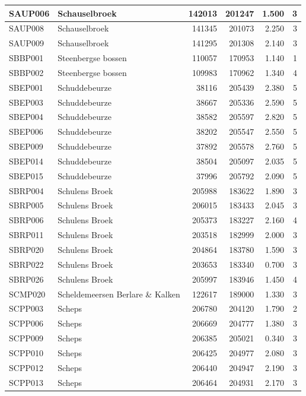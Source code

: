 \documentclass[11pt,]{book}
\begin{document}
\begin{table}
\begin{tabular}[t]{l|l|r|r|r|r}
SAUP006 & Schauselbroek & 142013 & 201247 & 1.500 & 3\\
\hline
SAUP008 & Schauselbroek & 141345 & 201073 & 2.250 & 3\\
\hline
SAUP009 & Schauselbroek & 141295 & 201308 & 2.140 & 3\\
\hline
SBBP001 & Steenbergse bossen & 110057 & 170953 & 1.140 & 1\\
\hline
SBBP002 & Steenbergse bossen & 109983 & 170962 & 1.340 & 4\\
\hline
SBEP001 & Schuddebeurze & 38116 & 205439 & 2.380 & 5\\
\hline
SBEP003 & Schuddebeurze & 38667 & 205336 & 2.590 & 5\\
\hline
SBEP004 & Schuddebeurze & 38582 & 205597 & 2.820 & 5\\
\hline
SBEP006 & Schuddebeurze & 38202 & 205547 & 2.550 & 5\\
\hline
SBEP009 & Schuddebeurze & 37892 & 205578 & 2.760 & 5\\
\hline
SBEP014 & Schuddebeurze & 38504 & 205097 & 2.035 & 5\\
\hline
SBEP015 & Schuddebeurze & 37996 & 205792 & 2.090 & 5\\
\hline
SBRP004 & Schulens Broek & 205988 & 183622 & 1.890 & 3\\
\hline
SBRP005 & Schulens Broek & 206015 & 183433 & 2.045 & 3\\
\hline
SBRP006 & Schulens Broek & 205373 & 183227 & 2.160 & 4\\
\hline
SBRP011 & Schulens Broek & 203518 & 182999 & 2.000 & 3\\
\hline
SBRP020 & Schulens Broek & 204864 & 183780 & 1.590 & 3\\
\hline
SBRP022 & Schulens Broek & 203653 & 183340 & 0.700 & 3\\
\hline
SBRP026 & Schulens Broek & 205997 & 183946 & 1.450 & 4\\
\hline
SCMP020 & Scheldemeersen Berlare \& Kalken & 122617 & 189000 & 1.330 & 3\\
\hline
SCPP003 & Scheps & 206780 & 204120 & 1.790 & 2\\
\hline
SCPP006 & Scheps & 206669 & 204777 & 1.380 & 3\\
\hline
SCPP009 & Scheps & 206385 & 205021 & 0.340 & 3\\
\hline
SCPP010 & Scheps & 206425 & 204977 & 2.080 & 3\\
\hline
SCPP012 & Scheps & 206440 & 204947 & 2.190 & 3\\
\hline
SCPP013 & Scheps & 206464 & 204931 & 2.170 & 3\\

\end{tabular}
\end{table}
\end{document}
